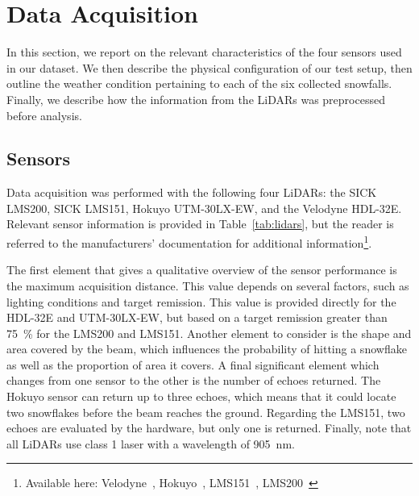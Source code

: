 \section{Data Acquisition}
\label{sec:chap_lidar_data_acquisition}

In this section, we report on the relevant characteristics of the four sensors used in our dataset. We then describe the physical configuration of our test setup, then outline the weather condition pertaining to each of the six collected snowfalls. Finally, we describe how the information from the LiDARs was preprocessed before analysis.

\subsection{Sensors}

Data acquisition was performed with the following four LiDARs: the SICK LMS200, SICK LMS151, Hokuyo UTM-30LX-EW, and the Velodyne HDL-32E. Relevant sensor information is provided in Table~\ref{tab:lidars}, but the reader is referred to the manufacturers' documentation for additional information\footnote{Available here: Velodyne~\citep{VelodyneManual}, Hokuyo~\citep{UTMDatasheet}, LMS151~\citep{LMS151Datasheet}, LMS200~\citep{LMS200Manual}}.

The first element that gives a qualitative overview of the sensor performance is the maximum acquisition distance. This value depends on several factors, such as lighting conditions and target remission. This value is provided directly for the HDL-32E and UTM-30LX-EW, but based on a target remission greater than \SI{75}{\percent} for the LMS200 and LMS151. Another element to consider is the shape and area covered by the beam, which influences the probability of hitting a snowflake as well as the proportion of area it covers. A final significant element which changes from one sensor to the other is the number of echoes returned. The Hokuyo sensor can return up to three echoes, which means that it could locate two snowflakes before the beam reaches the ground. Regarding the LMS151, two echoes are evaluated by the hardware, but only one is returned. Finally, note that all LiDARs use class 1 laser with a wavelength of \SI{905}{\nano\meter}.

